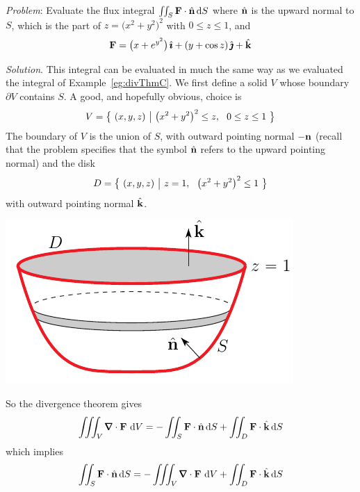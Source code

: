 \begin{eg}\label{eg:divThmC}
\noindent\textit{Problem}:
Evaluate the flux integral $\iint_S \mathbf{F}\cdot\hat{\mathbf{n}}\,\mathrm{d}S$ where
$\hat{\mathbf{n}} $ is the upward normal to $S$, which is the part of 
$z={\big(x^2+y^2\big)}^2$ with $0\le z\le 1$, and
\begin{equation*}
\mathbf{F} = \big(x+e^{y^2}\big)\,\hat{\pmb{\imath}} + (y+\cos z)\,\hat{\pmb{\jmath}} + \hat{\mathbf{k}}
\end{equation*}

\medskip
\noindent\textit{Solution}.
This integral can be evaluated in much the same way as we evaluated 
the integral of Example~\ref{eg:divThmC}. We first define a solid $V$ 
whose boundary $\partial V$ contains $S$. A good, and hopefully obvious, 
choice is
\begin{align*}
V = \big\{ \ (x,y,z)\ \big|\ {\big(x^2+y^2\big)}^2\le z,\ \ 0\le z\le 1 \ \big\}
\end{align*}
The boundary of $V$ is the union of $S$, with outward pointing normal $-\mathbf{n}$
(recall that the problem specifies that the symbol $\hat{\mathbf{n}}$ refers to
the upward pointing normal)  and the disk
\begin{equation*}
D = \Set{(x,y,z)}{z= 1,\ \  {\big(x^2+y^2\big)}^2\le 1}
\end{equation*}
with outward pointing normal $\hat{\mathbf{k}}$.
\begin{nfig}
\begin{center}
    \includegraphics{bowl.pdf}
\end{center}
\end{nfig}
So the divergence theorem gives
\begin{align*}
\tripInt_V\vnabla\cdot\vF\ \dee{V} 
= -\dblInt_S \vF\cdot\hn\,\dee{S}
 +\dblInt_{D} \vF\cdot\hk\,\dee{S}
\end{align*}
which implies
\begin{align*}
\dblInt_S \vF\cdot\hn\,\dee{S}
&= -\tripInt_V\vnabla\cdot\vF\ \dee{V} 
  +\dblInt_{D} \vF\cdot\hk\,\dee{S} \\

\end{align*}
\end{eg}
